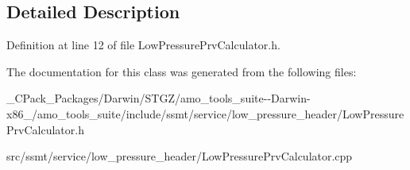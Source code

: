 \subsection{Detailed Description}


Definition at line 12 of file Low\+Pressure\+Prv\+Calculator.\+h.



The documentation for this class was generated from the following files\+:\begin{DoxyCompactItemize}
\item 
\+\_\+\+C\+Pack\+\_\+\+Packages/\+Darwin/\+S\+T\+G\+Z/amo\+\_\+tools\+\_\+suite-\/-\/\+Darwin-\/x86\+\_/amo\+\_\+tools\+\_\+suite/include/ssmt/service/low\+\_\+pressure\+\_\+header/Low\+Pressure\+Prv\+Calculator.\+h\item 
src/ssmt/service/low\+\_\+pressure\+\_\+header/Low\+Pressure\+Prv\+Calculator.\+cpp\end{DoxyCompactItemize}
